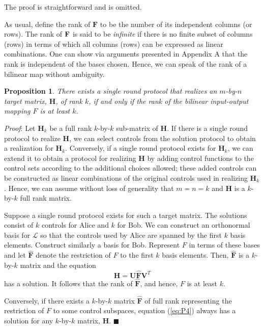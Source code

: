 \documentclass[12pt,onecolumn,draftcls]{IEEEtran}
\newtheorem{proposition}{Proposition}[section]
\begin{document}
The proof is straightforward and is omitted.

As usual, define the rank of $\mathbf{F}$ to be the number of its independent columns (or rows).
The rank of ${\bf F}$ is said to be {\em infinite} if there is no finite subset of columns (rows) in terms of which all columns (rows) can be expressed as linear combinations.  One can show via arguments presented in
Appendix A that the rank is independent of the bases chosen.
Hence, we can speak of the rank of a bilinear map without ambiguity.


\begin{proposition}
There exists a single round protocol that realizes an $m$-by-$n$ target matrix, $\mathbf{H}$, of rank $k$, 
if and only if the rank of the bilinear input-output mapping $F$ is at least $k$.
\end{proposition}

\noindent
\textit{Proof}: Let $\mathbf{H}_k$ be a full rank $k$-by-$k$ sub-matrix of $\mathbf{H}$. 
If there is a single round protocol to realize $\mathbf{H}$, we can select controls from the solution protocol
to obtain a realization for $\mathbf{H}_k$.  Conversely, if a single round protocol exists for $\mathbf{H}_k$,
we can extend it to obtain a protocol for realizing $\mathbf{H}$ by adding control functions to the
control sets according to the additional choices allowed; these added controls can be constructed as
linear combinations of the original controls used in realizing $\mathbf{H}_k$.  
Hence, we can assume without loss
of generality that $m=n=k$ and $\mathbf{H}$ is a $k$-by-$k$ full rank matrix.

Suppose a single round protocol exists for such a target matrix.  The solutions consist of
$k$ controls for Alice and $k$ for Bob.  We can construct an orthonormal basis for
$\mathcal{L}$ so that the controls used by Alice are spanned
by the first $k$ basis elements.   Construct similarly a basis for Bob.
Represent $F$ in terms of these bases and let $\mathbf{\hat{F}}$
denote the restriction of $F$ to the first $k$ basis elements.
Then, $\mathbf{\hat{F}}$ is a $k$-by-$k$ matrix and the equation
\begin{equation}
\mathbf{H}=\mathbf{U}\mathbf{\hat{F}}\mathbf{V}^T
\label{eq:P4}
\end{equation}
has a solution.  It follows that the rank of $\mathbf{\hat{F}}$, and hence, $F$ is at least $k$.

Conversely, if there exists a $k$-by-$k$ matrix $\mathbf{\hat{F}}$ of full rank representing the
restriction of $F$ to some control subspaces, equation (\ref{eq:P4}) always has a solution for
any $k$-by-$k$ matrix, $\mathbf{H}$.			\hfill $\blacksquare$
\end{document}
